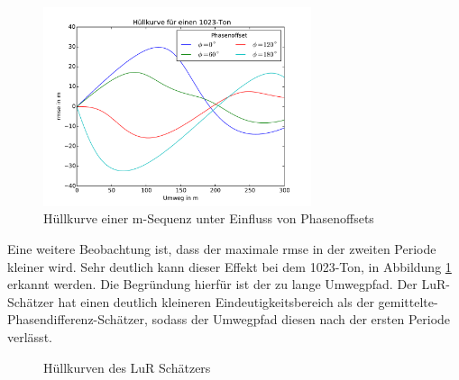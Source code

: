 \begin{figure}[htbp]
	\centering
	\includegraphics[width = 0.7\textwidth]{images/LuR_Hullkurven_1023_ohneTraeger}
	\caption{Hüllkurve einer m-Sequenz unter Einfluss von Phasenoffsets}
	\label{fig:LuRHüllkurve mit Phasenoffset}
\end{figure}
 
Eine weitere Beobachtung ist, dass der maximale \gls{rmse} in der zweiten Periode kleiner wird. Sehr deutlich kann dieser Effekt bei dem 1023-Ton, in Abbildung \ref{fig:LuRHüllkurve mit Phasenoffset} erkannt werden. Die Begründung hierfür ist der zu lange Umwegpfad. Der \gls{LuR}-Schätzer hat einen deutlich kleineren Eindeutigkeitsbereich als der gemittelte-Phasendifferenz-Schätzer, sodass der Umwegpfad diesen nach der ersten Periode verlässt.

\begin{figure}
		\caption{Hüllkurven des \gls{LuR} Schätzers}
		\label{fig:HüllkurvenLuR-Had}
\end{figure}				

